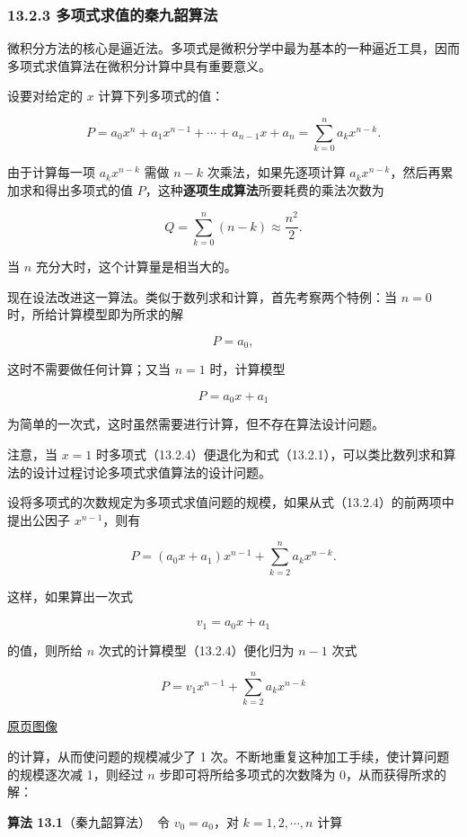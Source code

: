 \documentclass[
  10pt,
  fontset=fandol]{ctexart}
\begin{document}
\subsubsection{13.2.3 多项式求值的秦九韶算法}\label{ux591aux9879ux5f0fux6c42ux503cux7684ux79e6ux4e5dux97f6ux7b97ux6cd5}

微积分方法的核心是逼近法。多项式是微积分学中最为基本的一种逼近工具，因而多项式求值算法在微积分计算中具有重要意义。

设要对给定的 \(x\) 计算下列多项式的值：

\[
P=a_0x^n+a_1x^{n-1}+\cdots+a_{n-1}x+a_n
=\sum_{k=0}^{n}a_kx^{n-k}.
\tag{13.2.4}
\]

由于计算每一项 \(a_kx^{n-k}\) 需做 \(n-k\) 次乘法，如果先逐项计算 \(a_kx^{n-k}\)，然后再累加求和得出多项式的值 \(P\)，这种\textbf{逐项生成算法}所要耗费的乘法次数为

\[
Q=\sum_{k=0}^{n}(n-k)\approx\frac{n^2}{2}.
\]

当 \(n\) 充分大时，这个计算量是相当大的。

现在设法改进这一算法。类似于数列求和计算，首先考察两个特例：当 \(n=0\) 时，所给计算模型即为所求的解

\[
P=a_0,
\]

这时不需要做任何计算；又当 \(n=1\) 时，计算模型

\[
P=a_0x+a_1
\]

为简单的一次式，这时虽然需要进行计算，但不存在算法设计问题。

注意，当 \(x=1\) 时多项式（13.2.4）便退化为和式（13.2.1），可以类比数列求和算法的设计过程讨论多项式求值算法的设计问题。

设将多项式的次数规定为多项式求值问题的规模，如果从式（13.2.4）的前两项中提出公因子 \(x^{n-1}\)，则有

\[
P=(a_0x+a_1)x^{n-1}+\sum_{k=2}^{n}a_kx^{n-k}.
\]

这样，如果算出一次式

\[
v_1=a_0x+a_1
\]

的值，则所给 \(n\) 次式的计算模型（13.2.4）便化归为 \(n-1\) 次式

\[
P=v_1x^{n-1}+\sum_{k=2}^{n}a_kx^{n-k}
\]

\href{../../source-images/pdf-311.jpeg}{原页图像}

的计算，从而使问题的规模减少了 1 次。不断地重复这种加工手续，使计算问题的规模逐次减 1，则经过 \(n\) 步即可将所给多项式的次数降为 0，从而获得所求的解：

\textbf{算法 13.1}（秦九韶算法）　令 \(v_0=a_0\)，对 \(k=1,2,\cdots,n\) 计算
\end{document}
